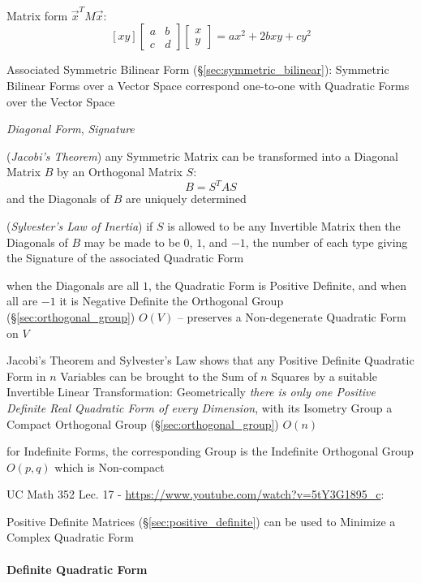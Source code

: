 Matrix form $\vec{x}^T M \vec{x}$:
\[
  [x y]
  \begin{bmatrix}
    a & b \\
    c & d
  \end{bmatrix}
  \begin{bmatrix}
    x \\
    y
  \end{bmatrix}
  = ax^2 + 2bxy + cy^2
\]

Associated Symmetric Bilinear Form (\S\ref{sec:symmetric_bilinear}): Symmetric
Bilinear Forms over a Vector Space correspond one-to-one with Quadratic Forms
over the Vector Space

\emph{Diagonal Form}, \emph{Signature}

(\emph{Jacobi's Theorem}) any Symmetric Matrix can be transformed into a
Diagonal Matrix $B$ by an Orthogonal Matrix $S$:
\[
  B = S^T A S
\]
and the Diagonals of $B$ are uniquely determined

(\emph{Sylvester's Law of Inertia}) if $S$ is allowed to be any Invertible
Matrix then the Diagonals of $B$ may be made to be $0$, $1$, and $-1$, the
number of each type giving the Signature of the associated Quadratic Form

when the Diagonals are all $1$, the Quadratic Form is Positive Definite, and
when all are $-1$ it is Negative Definite
the Orthogonal Group (\S\ref{sec:orthogonal_group}) $O(V)$ -- preserves a
Non-degenerate Quadratic Form on $V$

Jacobi's Theorem and Sylvester's Law shows that any Positive Definite Quadratic
Form in $n$ Variables can be brought to the Sum of $n$ Squares by a suitable
Invertible Linear Transformation: Geometrically \emph{there is only one
  Positive Definite Real Quadratic Form of every Dimension}, with its Isometry
Group a Compact Orthogonal Group (\S\ref{sec:orthogonal_group}) $O(n)$

for Indefinite Forms, the corresponding Group is the Indefinite Orthogonal
Group $O(p,q)$ which is Non-compact


UC Math 352 Lec. 17 - \url{https://www.youtube.com/watch?v=5tY3G1895_c}:

Positive Definite Matrices (\S\ref{sec:positive_definite}) can be used to
Minimize a Complex Quadratic Form



\paragraph{Definite Quadratic Form}\label{sec:definite_quadratic}\hfill

